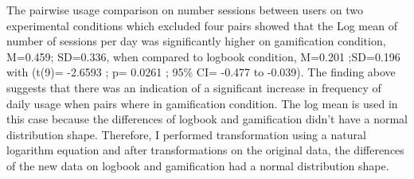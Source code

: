 The pairwise usage comparison on number sessions between users on  two experimental conditions which excluded four pairs showed that the Log mean of number of sessions per day was significantly higher on gamification condition, M=0.459; SD=0.336, when compared to logbook condition, M=0.201 ;SD=0.196 with (t(9)= -2.6593 ; p= 0.0261 ; 95\% CI=  -0.477 to -0.039). The finding above suggests that there was an indication of a significant increase in frequency of daily usage when pairs where in gamification condition. The log mean is used in this case because the differences of logbook and gamification didn't have a normal distribution shape. Therefore, I performed transformation using a natural logarithm equation and after transformations on the original data, the differences of the new data on logbook and gamification had a normal distribution shape.

